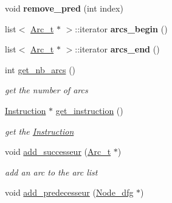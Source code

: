 \begin{DoxyCompactItemize}
\item 
\hypertarget{class_node__dfg_a0f65316cde0b35e7755d4ebf009b009b}{}void {\bfseries remove\+\_\+pred} (int index)\label{class_node__dfg_a0f65316cde0b35e7755d4ebf009b009b}

\item 
\hypertarget{class_node__dfg_a6ebd568efb70f729f6e355cdd46a5185}{}list$<$ \hyperlink{struct_arc__t}{Arc\+\_\+t} $\ast$ $>$\+::iterator {\bfseries arcs\+\_\+begin} ()\label{class_node__dfg_a6ebd568efb70f729f6e355cdd46a5185}

\item 
\hypertarget{class_node__dfg_a5a49217bcb16aaf7e94e4e156d9a9d53}{}list$<$ \hyperlink{struct_arc__t}{Arc\+\_\+t} $\ast$ $>$\+::iterator {\bfseries arcs\+\_\+end} ()\label{class_node__dfg_a5a49217bcb16aaf7e94e4e156d9a9d53}

\item 
\hypertarget{class_node__dfg_a85d42a5cc1d6feacf403a8569a813074}{}int \hyperlink{class_node__dfg_a85d42a5cc1d6feacf403a8569a813074}{get\+\_\+nb\+\_\+arcs} ()\label{class_node__dfg_a85d42a5cc1d6feacf403a8569a813074}

\begin{DoxyCompactList}\small\item\em get the number of arcs \end{DoxyCompactList}\item 
\hypertarget{class_node__dfg_a8f20c21a0ffb2e224cc426148362c249}{}\hyperlink{class_instruction}{Instruction} $\ast$ \hyperlink{class_node__dfg_a8f20c21a0ffb2e224cc426148362c249}{get\+\_\+instruction} ()\label{class_node__dfg_a8f20c21a0ffb2e224cc426148362c249}

\begin{DoxyCompactList}\small\item\em get the \hyperlink{class_instruction}{Instruction} \end{DoxyCompactList}\item 
\hypertarget{class_node__dfg_add9d669804bc8ad4a4b806221d9ef9e9}{}void \hyperlink{class_node__dfg_add9d669804bc8ad4a4b806221d9ef9e9}{add\+\_\+successeur} (\hyperlink{struct_arc__t}{Arc\+\_\+t} $\ast$)\label{class_node__dfg_add9d669804bc8ad4a4b806221d9ef9e9}

\begin{DoxyCompactList}\small\item\em add an arc to the arc list \end{DoxyCompactList}\item 
\hypertarget{class_node__dfg_a8cc89b32dbe15bcf399725955a643551}{}void \hyperlink{class_node__dfg_a8cc89b32dbe15bcf399725955a643551}{add\+\_\+predecesseur} (\hyperlink{class_node__dfg}{Node\+\_\+dfg} $\ast$)\label{class_node__dfg_a8cc89b32dbe15bcf399725955a643551}


\end{DoxyCompactItemize}
